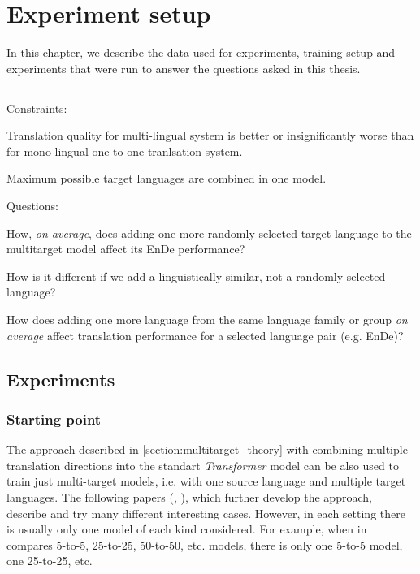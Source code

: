 \chapter{Experiment setup}
\label{chapter:experiment_setup}

In this chapter, we describe the data used for experiments, training setup
and experiments that were run to answer the questions asked in this thesis.

\section{}
\label{section:questions_and_constraints}

Constraints:
\begin{displayquote}
	Translation quality for multi-lingual system is better or insignificantly
	worse than for mono-lingual one-to-one tranlsation system.

	Maximum possible target languages are combined in one model.
\end{displayquote}

Questions:
\begin{displayquote}
	How, \emph{on average}, does adding one more randomly selected target language
	to the multitarget model affect its En\to{}De performance?

	How is it different if we add a linguistically similar,
	not a randomly selected language?

	How does adding one more language from the same language family or group 
	\emph{on average} affect translation performance for a selected language
	pair (e.g. En\to{}De)?
\end{displayquote}



\section{Experiments}
\label{section:experiments}
\subsection{Starting point}
\label{subsection:starting_point}

The approach described in \cref{section:multitarget_theory} with combining multiple
translation directions into the standart \emph{Transformer} model can be also used to
train just multi-target models, i.e. with one source language and multiple target languages.
The following papers
(, ),
which further develop the approach, describe and try many different interesting cases.
However, in each setting there is usually only one model of each kind considered.
For example, when in \citet{aharoni-etal-2019-massively} compares 5-to-5,
25-to-25, 50-to-50, etc. models, there is only one 5-to-5 model, one 25-to-25, etc.


